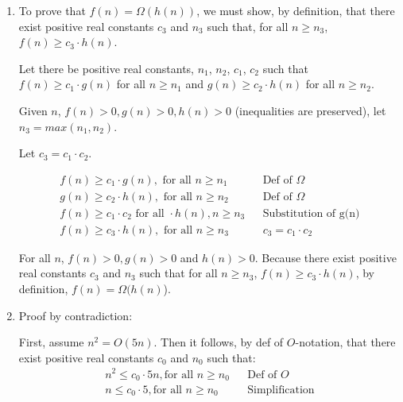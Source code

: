 \documentclass[a4paper]{report}
\begin{document}
\begin{enumerate}
    \par
    \bigskip

    \item To prove that $f(n) = \Omega(h(n))$, we must show, by definition, that there exist
      positive real constants $c_{3}$ and $n_{3}$ such that, for all $n \geq n_{3}$, $f(n) \geq c_{3} \cdot h(n)$.

    Let there be positive real constants, $n_{1}$, $n_{2}$, $c_{1}$, $c_{2}$ such that $f(n) \geq c_{1} \cdot g(n)$ for all $n \geq n_{1}$ and $g(n) \geq c_{2} \cdot h(n)$ for all $n \geq n_{2}$.

    Given $n$, $f(n) > 0, g(n) > 0, h(n) > 0$ (inequalities are preserved), let $n_{3} = max(n_{1}, n_{2})$. 

    Let $c_{3} = c_{1} \cdot c_{2}$.

    \setcounter{equation}{0}
    \begin{align}
      f(n) \geq c_{1} \cdot g(n), \text { for all } n \geq n_{1}             &&\text{Def of $\Omega$}\\
      g(n) \geq c_{2} \cdot h(n), \text { for all } n \geq n_{2}             &&\text{Def of $\Omega$}\\
      f(n) \geq c_{1} \cdot c_{2} \text { for all } \cdot h(n), n \geq n_{3} &&\text{Substitution of g(n)}\\
      f(n) \geq c_{3} \cdot h(n), \text { for all } n \geq n_{3}             &&\text{$c_{3} = c_{1} \cdot c_{2}$}
    \end{align}

    For all $n$, $f(n) > 0, g(n) > 0$ and $h(n) > 0$.
    Because there exist positive real constants $c_{3}$ and $n_{3}$ such that for all $n \geq n_{3}$, 
    $f(n) \geq c_{3} \cdot h(n)$, by definition, $f(n) = \Omega(h(n)$).

    \par
    \bigskip
    \setcounter{equation}{0}

    \item Proof by contradiction: 

    First, assume $n^2 = O(5n)$. Then it follows, by def of $O$-notation, that there exist positive real constants $c_{0}$ and $n_{0}$ such that:
    \begin{align}
      n^2 \leq c_{0} \cdot 5n, \text{for all } n \geq n_{0}               &&\text{Def of $O$}\\
      n \leq c_{0} \cdot 5, \text{for all } n \geq n_{0}                  &&\text{Simplification}
    \end{align}


\end{enumerate}
\end{document}
